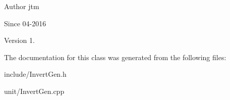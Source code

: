 \begin{DoxyAuthor}{Author}
jtm 
\end{DoxyAuthor}
\begin{DoxySince}{Since}
04-\/2016 
\end{DoxySince}
\begin{DoxyVersion}{Version}
1. 
\end{DoxyVersion}


The documentation for this class was generated from the following files\-:\begin{DoxyCompactItemize}
\item 
include/Invert\-Gen.\-h\item 
unit/Invert\-Gen.\-cpp\end{DoxyCompactItemize}
